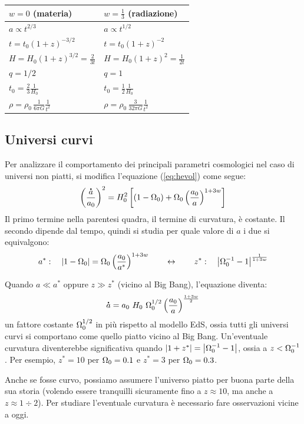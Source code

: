 \begin{table}[h]
\centering
\def\arraystretch{1.5}
\begin{tabular}{@{}ll@{}}
\toprule
\textbf{$w=0$ (materia)} & \textbf{$w=\frac{1}{3}$ (radiazione)} \\ \midrule
$a\propto t^{2/3}$ & $a\propto t^{1/2}$ \\
$t = t_0 \left ( 1+z \right )^{-3/2}$ & $t = t_0 \left ( 1+z \right )^{-2}$ \\
$H = H_0 (1+z)^{3/2} = \frac{2}{3t} $ & $H = H_0 (1+z)^{2} = \frac{1}{2t}$ \\
$q =1/2 $ & $q = 1$ \\
$t_0 = \frac{2}{3}\frac{1}{H_0}$ & $t_0 = \frac{1}{2}\frac{1}{H_0}$ \\
$\rho  = \rho_0\, \frac{1}{6\pi G}\frac{1}{t^2}$ & $\rho  =  \rho_0\, \frac{3}{32\pi G}\frac{1}{t^2}$ \\ \bottomrule
\end{tabular}
\end{table}

\subsection{Universi curvi}
Per analizzare il comportamento dei principali parametri cosmologici nel caso di universi non piatti, si modifica l'equazione (\ref{eq:hevol}) come segue:
$$
\left ( \frac{\accentset{\mbox{\large\bfseries .}}{a}}{a_0} \right )^2 = H_0^2 \left [ (1-\Omega_0 ) + \Omega_0 \left ( \frac{a_0}{a} \right )^{1+3w} \right ]
$$
Il primo termine nella parentesi quadra, il termine di curvatura, è costante. Il secondo dipende dal tempo, quindi si studia per quale valore di $a$ i due si equivalgono:
$$
a^*:\quad \left | 1-\Omega_0  \right | = \Omega_0\left ( \frac{a_0}{a^*} \right )^{1+3w}\qquad \leftrightarrow \qquad z^*:\quad \left | \Omega_0^{-1} - 1  \right |^{\frac{1}{1+3w}}
$$

Quando $a\ll a^*$ oppure $z\gg z^*$ (vicino al Big Bang), l'equazione diventa:
$$
\accentset{\mbox{\large\bfseries .}}{a}=a_0~ H_0 ~\Omega_0^{1/2} \left ( \frac{a_0}{a}\right )^{\frac{1+3w}{2}}
$$
un fattore costante $\Omega_0^{1/2}$ in più rispetto al modello EdS, ossia tutti gli universi curvi si comportano come quello piatto vicino al Big Bang. Un'eventuale curvatura diventerebbe significativa quando  $\left |  1+z^* \right | =  \left | \Omega_0^{-1} - 1  \right |$, ossia a $z< \Omega_0^{-1}$. Per esempio, $z^* =10$ per $\Omega_0=0.1$ e $z^* = 3$ per $\Omega_0=0.3$.

\begin{theorem}
Anche se fosse curvo, possiamo assumere l'universo piatto per buona parte della sua storia (volendo essere tranquilli sicuramente fino a $z\approx 10$, ma anche a $z\approx 1\div 2$). Per studiare l'eventuale curvatura è necessario fare osservazioni vicine a oggi.
\end{theorem}

